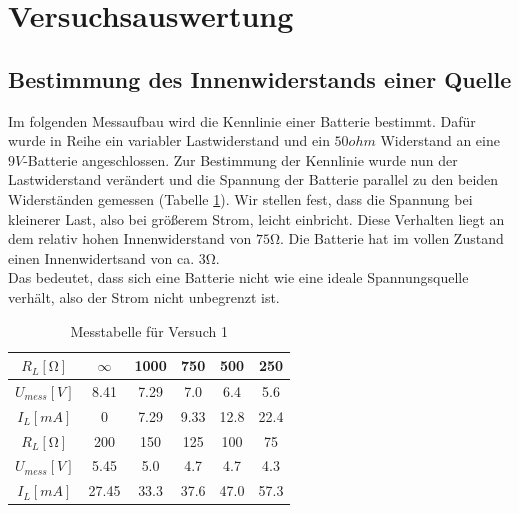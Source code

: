 \documentclass[a4paper]{article}
\begin{document}
\section{Versuchsauswertung}

\subsection{Bestimmung des Innenwiderstands einer Quelle}
Im folgenden Messaufbau wird die Kennlinie einer Batterie bestimmt. Dafür wurde in Reihe ein variabler Lastwiderstand und ein $50\si{ohm}$ Widerstand an eine $9\si{V}$-Batterie angeschlossen.
Zur Bestimmung der Kennlinie wurde nun der Lastwiderstand verändert und die Spannung der Batterie parallel zu den beiden Widerständen gemessen (Tabelle \ref{tab:messtab1}).
Wir stellen fest, dass die Spannung bei kleinerer Last, also bei größerem Strom, leicht einbricht. Diese Verhalten liegt an dem relativ hohen Innenwiderstand von $75\si{\ohm}$. Die Batterie hat im vollen Zustand einen Innenwidertsand von ca. $3\si{\ohm}$.\\ 
Das bedeutet, dass sich eine Batterie nicht wie eine ideale Spannungsquelle verhält, also der Strom nicht unbegrenzt ist.
\begin{table}[ht]
    \centering
    \begin{tabular}{| c | c | c | c | c | c |}
        \hline
         $R_L [\si{\ohm}]$ & $\infty$ & 1000 & 750 & 500 & 250\\\hline
         $U_{mess} [\si{V}]$ & 8.41 & 7.29 & 7.0 & 6.4 & 5.6\\\hline
         $I_{L} [\si{mA}]$ & 0 & 7.29 & 9.33 & 12.8 & 22.4\\\hline\hline
         $R_L [\si{\ohm}]$ & 200 & 150 & 125 & 100 & 75\\\hline
         $U_{mess} [\si{V}]$ & 5.45 & 5.0 & 4.7 & 4.7 & 4.3\\\hline
         $I_{L} [\si{mA}]$ & 27.45 & 33.3 & 37.6 & 47.0 & 57.3\\\hline
    \end{tabular}
    \caption{Messtabelle für Versuch 1}
    \label{tab:messtab1}
\end{table}
\end{document}
